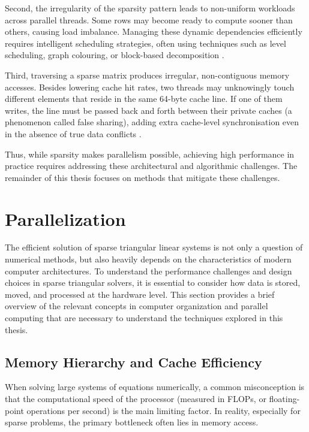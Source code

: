Second, the irregularity of the sparsity pattern leads to non-uniform workloads across parallel threads. Some rows may become ready to compute sooner than others, causing load imbalance. Managing these dynamic dependencies efficiently requires intelligent scheduling strategies, often using techniques such as level scheduling, graph colouring, or block-based decomposition \cite{10.1007/978-3-031-64850-2_42}.

Third, traversing a sparse matrix produces irregular, non-contiguous memory accesses.  Besides lowering cache hit rates, two threads may unknowingly touch different elements that reside in the same 64-byte cache line. If one of them writes, the line must be passed back and forth between their private caches (a phenomenon called false sharing), adding extra cache-level synchronisation even in
the absence of true data conflicts \cite{data_layout}.

Thus, while sparsity makes parallelism possible, achieving high performance in practice requires addressing these architectural and algorithmic challenges. The remainder of this thesis focuses on methods that mitigate these challenges.

\section{Parallelization}
\label{chap:lr_technical_background}
The efficient solution of sparse triangular linear systems is not only a question of numerical methods, but also heavily depends on the characteristics of modern computer architectures. To understand the performance challenges and design choices in sparse triangular solvers, it is essential to consider how data is stored, moved, and processed at the hardware level. This section provides a brief overview of the relevant concepts in computer organization and parallel computing that are necessary to understand the techniques explored in this thesis.

\subsection{Memory Hierarchy and Cache Efficiency}
When solving large systems of equations numerically, a common misconception is that the computational speed of the processor (measured in FLOPs, or floating-point operations per second) is the main limiting factor. In reality, especially for sparse problems, the primary bottleneck often lies in memory access.

